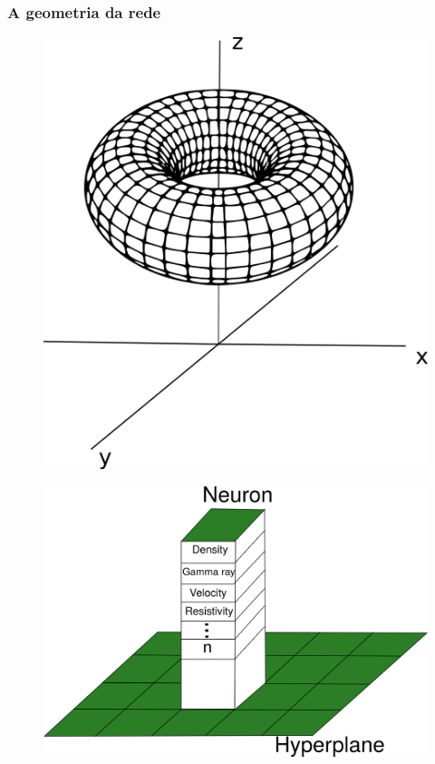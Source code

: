 \documentclass[aspectratio=10]{beamer} %
\begin{document}
\begin{frame}
\frametitle{A geometria da rede}

\begin{figure}[H]
\flushleft
\includegraphics[scale=0.2]{Imagens/toro.png}
\label{toro}
\end{figure}
\begin{figure}[H]
\flushright
\includegraphics[scale=0.35]{Imagens/hiperplano.png}
\label{hiperplano}
\end{figure}

\end{frame}
\end{document}
